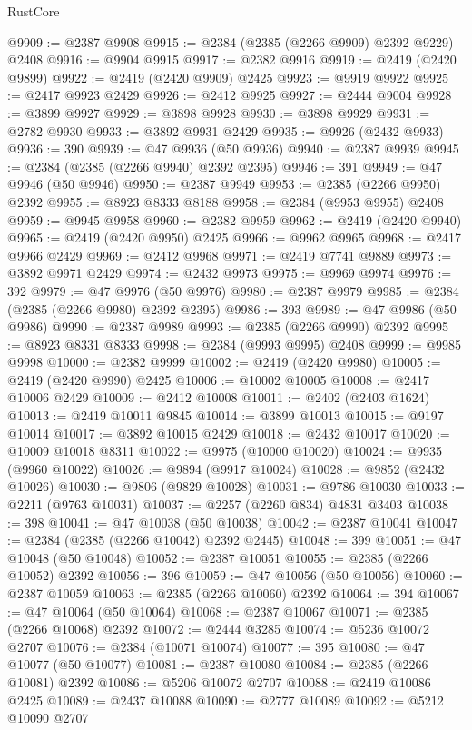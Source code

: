 \begin{lexlean}{RustCore}
\begin{coremodule}
@9909 := @2387 @9908
@9915 := @2384 (@2385 (@2266 @9909) @2392 @9229) @2408
@9916 := @9904 @9915
@9917 := @2382 @9916
@9919 := @2419 (@2420 @9899)
@9922 := @2419 (@2420 @9909) @2425
@9923 := @9919 @9922
@9925 := @2417 @9923 @2429
@9926 := @2412 @9925
@9927 := @2444 @9004
@9928 := @3899 @9927
@9929 := @3898 @9928
@9930 := @3898 @9929
@9931 := @2782 @9930
@9933 := @3892 @9931 @2429
@9935 := @9926 (@2432 @9933)
@9936 := 390
@9939 := @47 @9936 (@50 @9936)
@9940 := @2387 @9939
@9945 := @2384 (@2385 (@2266 @9940) @2392 @2395)
@9946 := 391
@9949 := @47 @9946 (@50 @9946)
@9950 := @2387 @9949
@9953 := @2385 (@2266 @9950) @2392
@9955 := @8923 @8333 @8188
@9958 := @2384 (@9953 @9955) @2408
@9959 := @9945 @9958
@9960 := @2382 @9959
@9962 := @2419 (@2420 @9940)
@9965 := @2419 (@2420 @9950) @2425
@9966 := @9962 @9965
@9968 := @2417 @9966 @2429
@9969 := @2412 @9968
@9971 := @2419 @7741 @9889
@9973 := @3892 @9971 @2429
@9974 := @2432 @9973
@9975 := @9969 @9974
@9976 := 392
@9979 := @47 @9976 (@50 @9976)
@9980 := @2387 @9979
@9985 := @2384 (@2385 (@2266 @9980) @2392 @2395)
@9986 := 393
@9989 := @47 @9986 (@50 @9986)
@9990 := @2387 @9989
@9993 := @2385 (@2266 @9990) @2392
@9995 := @8923 @8331 @8333
@9998 := @2384 (@9993 @9995) @2408
@9999 := @9985 @9998
@10000 := @2382 @9999
@10002 := @2419 (@2420 @9980)
@10005 := @2419 (@2420 @9990) @2425
@10006 := @10002 @10005
@10008 := @2417 @10006 @2429
@10009 := @2412 @10008
@10011 := @2402 (@2403 @1624)
@10013 := @2419 @10011 @9845
@10014 := @3899 @10013
@10015 := @9197 @10014
@10017 := @3892 @10015 @2429
@10018 := @2432 @10017
@10020 := @10009 @10018 @8311
@10022 := @9975 (@10000 @10020)
@10024 := @9935 (@9960 @10022)
@10026 := @9894 (@9917 @10024)
@10028 := @9852 (@2432 @10026)
@10030 := @9806 (@9829 @10028)
@10031 := @9786 @10030
@10033 := @2211 (@9763 @10031)
@10037 := @2257 (@2260 @834) @4831 @3403
@10038 := 398
@10041 := @47 @10038 (@50 @10038)
@10042 := @2387 @10041
@10047 := @2384 (@2385 (@2266 @10042) @2392 @2445)
@10048 := 399
@10051 := @47 @10048 (@50 @10048)
@10052 := @2387 @10051
@10055 := @2385 (@2266 @10052) @2392
@10056 := 396
@10059 := @47 @10056 (@50 @10056)
@10060 := @2387 @10059
@10063 := @2385 (@2266 @10060) @2392
@10064 := 394
@10067 := @47 @10064 (@50 @10064)
@10068 := @2387 @10067
@10071 := @2385 (@2266 @10068) @2392
@10072 := @2444 @3285
@10074 := @5236 @10072 @2707
@10076 := @2384 (@10071 @10074)
@10077 := 395
@10080 := @47 @10077 (@50 @10077)
@10081 := @2387 @10080
@10084 := @2385 (@2266 @10081) @2392
@10086 := @5206 @10072 @2707
@10088 := @2419 @10086 @2425
@10089 := @2437 @10088
@10090 := @2777 @10089
@10092 := @5212 @10090 @2707

\end{coremodule}
\end{lexlean}
